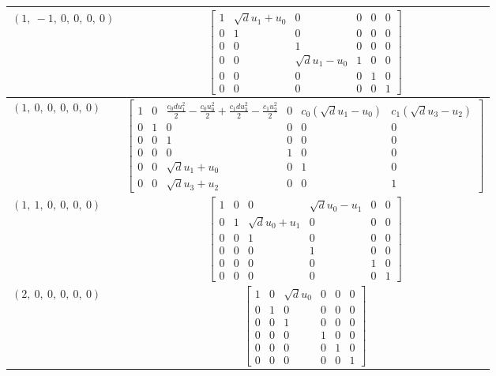 \documentclass[11pt]{article}
\theoremstyle{definition}
\begin{document}
\begin{longtable}{|l|c|}
    \hline
    $\left( 1, \  -1, \  0, \  0, \  0, \  0\right)$ & ${\left[\begin{matrix}1 & \sqrt{d} u_{1} + u_{0} & 0 & 0 & 0 & 0\\0 & 1 & 0 & 0 & 0 & 0\\0 & 0 & 1 & 0 & 0 & 0\\0 & 0 & \sqrt{d} u_{1} - u_{0} & 1 & 0 & 0\\0 & 0 & 0 & 0 & 1 & 0\\0 & 0 & 0 & 0 & 0 & 1\end{matrix}\right]}$ \\
    \hline
    $\left( 1, \  0, \  0, \  0, \  0, \  0\right)$ & ${\left[\begin{matrix}1 & 0 & \frac{c_{0} d u_{1}^{2}}{2} - \frac{c_{0} u_{0}^{2}}{2} + \frac{c_{1} d u_{3}^{2}}{2} - \frac{c_{1} u_{2}^{2}}{2} & 0 & c_{0} \left(\sqrt{d} u_{1} - u_{0}\right) & c_{1} \left(\sqrt{d} u_{3} - u_{2}\right)\\0 & 1 & 0 & 0 & 0 & 0\\0 & 0 & 1 & 0 & 0 & 0\\0 & 0 & 0 & 1 & 0 & 0\\0 & 0 & \sqrt{d} u_{1} + u_{0} & 0 & 1 & 0\\0 & 0 & \sqrt{d} u_{3} + u_{2} & 0 & 0 & 1\end{matrix}\right]}$ \\
    \hline
    $\left( 1, \  1, \  0, \  0, \  0, \  0\right)$ & ${\left[\begin{matrix}1 & 0 & 0 & \sqrt{d} u_{0} - u_{1} & 0 & 0\\0 & 1 & \sqrt{d} u_{0} + u_{1} & 0 & 0 & 0\\0 & 0 & 1 & 0 & 0 & 0\\0 & 0 & 0 & 1 & 0 & 0\\0 & 0 & 0 & 0 & 1 & 0\\0 & 0 & 0 & 0 & 0 & 1\end{matrix}\right]}$ \\
    \hline
    $\left( 2, \  0, \  0, \  0, \  0, \  0\right)$ & ${\left[\begin{matrix}1 & 0 & \sqrt{d} u_{0} & 0 & 0 & 0\\0 & 1 & 0 & 0 & 0 & 0\\0 & 0 & 1 & 0 & 0 & 0\\0 & 0 & 0 & 1 & 0 & 0\\0 & 0 & 0 & 0 & 1 & 0\\0 & 0 & 0 & 0 & 0 & 1\end{matrix}\right]}$ \\
    \hline
\end{longtable}
\end{document}
